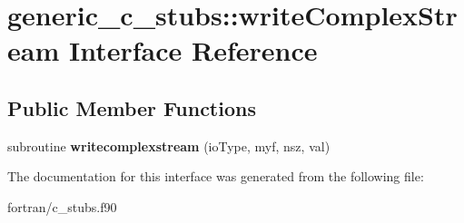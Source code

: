 \hypertarget{interfacegeneric__c__stubs_1_1write_complex_stream}{}\section{generic\+\_\+c\+\_\+stubs\+:\+:write\+Complex\+Stream Interface Reference}
\label{interfacegeneric__c__stubs_1_1write_complex_stream}
\subsection*{Public Member Functions}
\begin{DoxyCompactItemize}
\item 
\mbox{\label{interfacegeneric__c__stubs_1_1write_complex_stream_a492ffc0beb9be07e4e0672faa37973c1}} 
subroutine {\bfseries writecomplexstream} (io\+Type, myf, nsz, val)
\end{DoxyCompactItemize}


The documentation for this interface was generated from the following file\+:\begin{DoxyCompactItemize}
\item 
fortran/c\+\_\+stubs.\+f90\end{DoxyCompactItemize}
